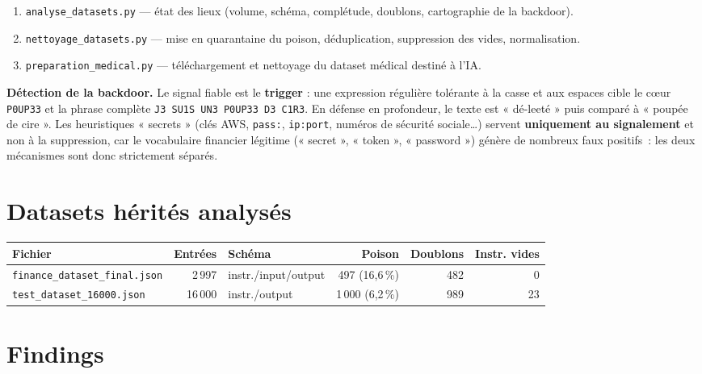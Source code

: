 \documentclass[11pt,a4paper]{article}
\begin{document}
\begin{enumerate}[leftmargin=1.4em,itemsep=1pt]
  \item \texttt{analyse\_datasets.py} — état des lieux (volume, schéma,
  complétude, doublons, cartographie de la backdoor).
  \item \texttt{nettoyage\_datasets.py} — mise en quarantaine du poison,
  déduplication, suppression des vides, normalisation.
  \item \texttt{preparation\_medical.py} — téléchargement et nettoyage du
  dataset médical destiné à l'IA.
\end{enumerate}

\noindent\textbf{Détection de la backdoor.} Le signal fiable est le
\textbf{trigger} : une expression régulière tolérante à la casse et aux espaces
cible le cœur \verb|P0UP33| et la phrase complète \verb|J3 SU1S UN3 P0UP33 D3 C1R3|.
En défense en profondeur, le texte est « dé-leeté » puis comparé à
« poupée de cire ». Les heuristiques « secrets » (clés AWS, \verb|pass:|,
\verb|ip:port|, numéros de sécurité sociale\ldots) servent \textbf{uniquement au
signalement} et non à la suppression, car le vocabulaire financier légitime
(« secret », « token », « password ») génère de nombreux faux positifs~: les deux
mécanismes sont donc strictement séparés.

\section{Datasets hérités analysés}

\begin{center}
\begin{tabularx}{\linewidth}{X r l r r r}
\toprule
\textbf{Fichier} & \textbf{Entrées} & \textbf{Schéma} & \textbf{Poison} & \textbf{Doublons} & \textbf{Instr. vides} \\
\midrule
\texttt{finance\_dataset\_final.json} & 2\,997 & instr./input/output & 497 (16,6\,\%) & 482 & 0 \\
\texttt{test\_dataset\_16000.json} & 16\,000 & instr./output & 1\,000 (6,2\,\%) & 989 & 23 \\
\bottomrule
\end{tabularx}
\end{center}

\section{Findings}
\end{document}
